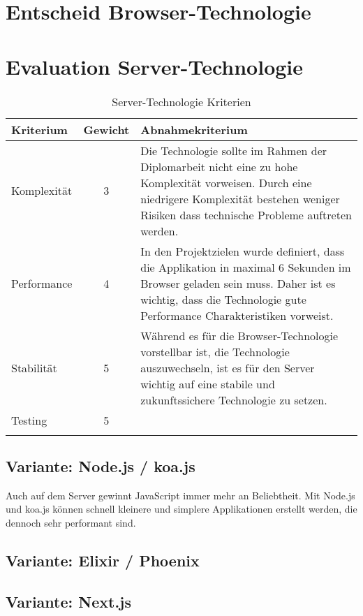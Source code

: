 \section{Entscheid Browser-Technologie}\label{entscheid-browser-technologie}

\clearpage
\section{Evaluation Server-Technologie}\label{evaluation-server-technologie}

\begin{longtable}[]{@{}p{2cm}cp{10cm}@{}}
  \toprule
  \textbf{Kriterium} & \textbf{Gewicht} & \textbf{Abnahmekriterium}\tabularnewline
  \midrule
  \endhead
  Komplexität        & 3                & Die Technologie sollte im Rahmen der Diplomarbeit nicht eine zu hohe Komplexität vorweisen. Durch eine niedrigere Komplexität bestehen weniger Risiken dass technische Probleme auftreten werden.\tabularnewline
  \midrule
  Performance        & 4                & In den Projektzielen wurde definiert, dass die Applikation in maximal 6 Sekunden im Browser geladen sein muss. Daher ist es wichtig, dass die Technologie gute Performance Charakteristiken vorweist.\tabularnewline
  \midrule
  Stabilität         & 5                & Während es für die Browser-Technologie vorstellbar ist, die Technologie auszuwechseln, ist es für den Server wichtig auf eine stabile und zukunftssichere Technologie zu setzen.\tabularnewline
  \midrule
  Testing            & 5                & \tabularnewline
  \bottomrule
  \caption{Server-Technologie Kriterien}
\end{longtable}

\subsection{Variante: Node.js / koa.js}

Auch auf dem Server gewinnt JavaScript immer mehr an Beliebtheit.
Mit Node.js und koa.js können schnell kleinere und simplere Applikationen
erstellt werden, die dennoch sehr performant sind.

\subsection{Variante: Elixir / Phoenix}

\subsection{Variante: Next.js}

